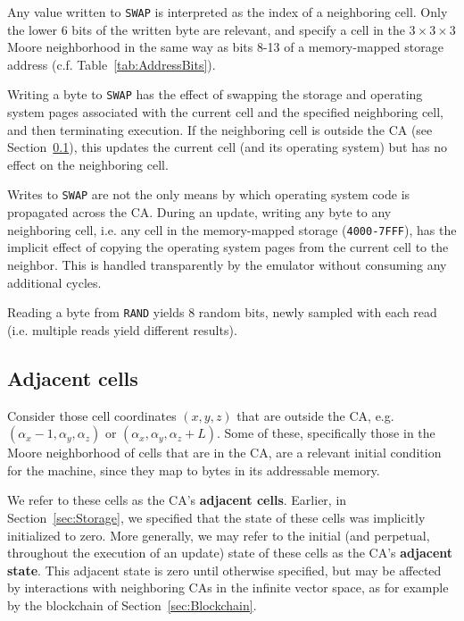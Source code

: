 \documentclass{article}
\newcommand\code[1]{{\tt #1}}
\newcommand\hex[1]{{\tt #1}}
\newcommand\hexrange[2]{\hex{#1}{\tt -}\hex{#2}}
\begin{document}
Any value written to \code{SWAP} is interpreted as the index of a neighboring cell.
Only the lower 6 bits of the written byte are relevant, and specify a cell in the $3 \times 3 \times 3$ Moore neighborhood
in the same way as bits 8-13 of a memory-mapped storage address (c.f. Table~\ref{tab:AddressBits}).

Writing a byte to \code{SWAP} has the effect of swapping the storage and operating system pages associated with the current cell and the specified neighboring cell,
and then terminating execution.
If the neighboring cell is outside the CA (see Section~\ref{sec:AdjacentCells}),
this updates the current cell (and its operating system) but has no effect on the neighboring cell.

Writes to \code{SWAP} are not the only means by which operating system code is propagated across the CA.
During an update, writing any byte to any neighboring cell, i.e. any cell in the memory-mapped storage (\hexrange{4000}{7FFF}),
has the implicit effect of copying the operating system pages from the current cell to the neighbor.
This is handled transparently by the emulator without consuming any additional cycles.

Reading a byte from \code{RAND} yields 8 random bits, newly sampled with each read (i.e. multiple reads yield different results).

\subsection{Adjacent cells}
\label{sec:AdjacentCells}

Consider those cell coordinates $(x,y,z)$ that are outside the CA,
e.g. $(\alpha_x-1,\alpha_y,\alpha_z)$ or  $(\alpha_x,\alpha_y,\alpha_z + L)$.
Some of these, specifically those in the Moore neighborhood of cells that are in the CA,
are a relevant initial condition for the machine,
since they map to bytes in its addressable memory.

We refer to these cells as the CA's {\bf adjacent cells}.
Earlier, in Section~\ref{sec:Storage}, we specified that the state of these cells was implicitly initialized to zero.
More generally, we may refer to the initial (and perpetual, throughout the execution of an update)
state of these cells as the CA's {\bf adjacent state}.
This adjacent state is zero until otherwise specified, but may be affected
by interactions with neighboring CAs in the infinite vector space,
as for example by the blockchain of Section~\ref{sec:Blockchain}.
\end{document}
